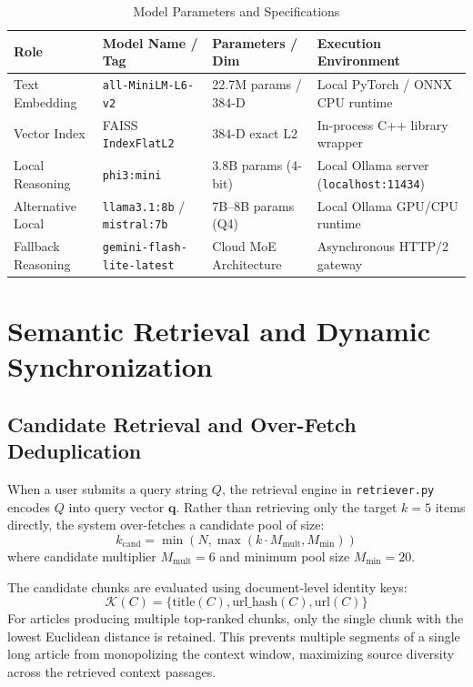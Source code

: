 \begin{table}[H]
\centering
\caption{Model Parameters and Specifications}
\label{tab:model_specs}
\small
\renewcommand{\arraystretch}{1.3}
\begin{tabularx}{\linewidth}{|l|l|l|X|}
\hline
\textbf{Role} & \textbf{Model Name / Tag} & \textbf{Parameters / Dim} & \textbf{Execution Environment} \\
\hline
Text Embedding & \texttt{all-MiniLM-L6-v2} & 22.7M params / 384-D & Local PyTorch / ONNX CPU runtime \\
\hline
Vector Index & FAISS \texttt{IndexFlatL2} & 384-D exact L2 & In-process C++ library wrapper \\
\hline
Local Reasoning & \texttt{phi3:mini} & 3.8B params (4-bit) & Local Ollama server (\texttt{localhost:11434}) \\
\hline
Alternative Local & \texttt{llama3.1:8b} / \texttt{mistral:7b} & 7B--8B params (Q4) & Local Ollama GPU/CPU runtime \\
\hline
Fallback Reasoning & \texttt{gemini-flash-lite-latest} & Cloud MoE Architecture & Asynchronous HTTP/2 gateway \\
\hline
\end{tabularx}
\end{table}

\section{Semantic Retrieval and Dynamic Synchronization}
\label{sec:retrieval_sync}

\subsection{Candidate Retrieval and Over-Fetch Deduplication}
When a user submits a query string $Q$, the retrieval engine in \texttt{retriever.py} encodes $Q$ into query vector $\mathbf{q}$. Rather than retrieving only the target $k = 5$ items directly, the system over-fetches a candidate pool of size:
\begin{equation}
k_{\text{cand}} = \min(N, \max(k \cdot M_{\text{mult}}, M_{\text{min}}))
\end{equation}
where candidate multiplier $M_{\text{mult}} = 6$ and minimum pool size $M_{\text{min}} = 20$. 

The candidate chunks are evaluated using document-level identity keys:
\begin{equation}
\mathcal{K}(C) = \{ \text{title}(C), \text{url\_hash}(C), \text{url}(C) \}
\end{equation}
For articles producing multiple top-ranked chunks, only the single chunk with the lowest Euclidean distance is retained. This prevents multiple segments of a single long article from monopolizing the context window, maximizing source diversity across the retrieved context passages.

